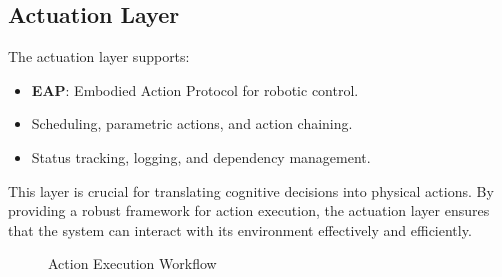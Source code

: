 \documentclass[12pt]{article}
\begin{document}
\subsection{Actuation Layer}
The actuation layer supports:
\begin{itemize}
  \item \textbf{EAP}: Embodied Action Protocol for robotic control.
  \item Scheduling, parametric actions, and action chaining.
  \item Status tracking, logging, and dependency management.
\end{itemize}

This layer is crucial for translating cognitive decisions into physical actions. By providing a robust framework for action execution, the actuation layer ensures that the system can interact with its environment effectively and efficiently.

\begin{figure}[H]
\centering
{}
\caption{Action Execution Workflow}
\end{figure}
\end{document}

